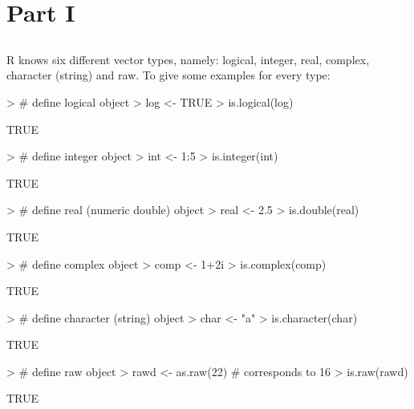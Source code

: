 \documentclass{article}
\begin{document}



\section{Part I}

\subsection{}

R knows six different vector types, namely: logical, integer, real, complex, character (string) and raw. To give some examples for every type:

\begin{Schunk}
\begin{Sinput}
> # define logical object
> log <- TRUE
> is.logical(log)
\end{Sinput}
\begin{Soutput}
[1] TRUE
\end{Soutput}
\begin{Sinput}
> # define integer object
> int <- 1:5
> is.integer(int)
\end{Sinput}
\begin{Soutput}
[1] TRUE
\end{Soutput}
\begin{Sinput}
> # define real (numeric double) object
> real <- 2.5
> is.double(real)
\end{Sinput}
\begin{Soutput}
[1] TRUE
\end{Soutput}
\begin{Sinput}
> # define complex object
> comp <- 1+2i
> is.complex(comp)
\end{Sinput}
\begin{Soutput}
[1] TRUE
\end{Soutput}
\begin{Sinput}
> # define character (string) object
> char <- "a"
> is.character(char)
\end{Sinput}
\begin{Soutput}
[1] TRUE
\end{Soutput}
\begin{Sinput}
> # define raw object
> rawd <- as.raw(22) # corresponds to 16
> is.raw(rawd)
\end{Sinput}
\begin{Soutput}
[1] TRUE
\end{Soutput}
\end{Schunk}
\end{document}
